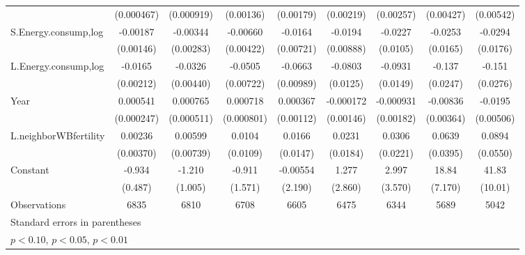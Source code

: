 \begin{table}[htbp]
\begin{tabular}{l*{8}{c}}
                    &  (0.000467)         &  (0.000919)         &   (0.00136)         &   (0.00179)         &   (0.00219)         &   (0.00257)         &   (0.00427)         &   (0.00542)         \\
[1em]
S.Energy.consump,log&    -0.00187         &    -0.00344         &    -0.00660         &     -0.0164\sym{**} &     -0.0194\sym{**} &     -0.0227\sym{**} &     -0.0253         &     -0.0294\sym{*}  \\
                    &   (0.00146)         &   (0.00283)         &   (0.00422)         &   (0.00721)         &   (0.00888)         &    (0.0105)         &    (0.0165)         &    (0.0176)         \\
[1em]
L.Energy.consump,log&     -0.0165\sym{***}&     -0.0326\sym{***}&     -0.0505\sym{***}&     -0.0663\sym{***}&     -0.0803\sym{***}&     -0.0931\sym{***}&      -0.137\sym{***}&      -0.151\sym{***}\\
                    &   (0.00212)         &   (0.00440)         &   (0.00722)         &   (0.00989)         &    (0.0125)         &    (0.0149)         &    (0.0247)         &    (0.0276)         \\
[1em]
Year                &    0.000541\sym{**} &    0.000765         &    0.000718         &    0.000367         &   -0.000172         &   -0.000931         &    -0.00836\sym{**} &     -0.0195\sym{***}\\
                    &  (0.000247)         &  (0.000511)         &  (0.000801)         &   (0.00112)         &   (0.00146)         &   (0.00182)         &   (0.00364)         &   (0.00506)         \\
[1em]
L.neighborWBfertility&     0.00236         &     0.00599         &      0.0104         &      0.0166         &      0.0231         &      0.0306         &      0.0639         &      0.0894         \\
                    &   (0.00370)         &   (0.00739)         &    (0.0109)         &    (0.0147)         &    (0.0184)         &    (0.0221)         &    (0.0395)         &    (0.0550)         \\
[1em]
Constant            &      -0.934\sym{*}  &      -1.210         &      -0.911         &    -0.00554         &       1.277         &       2.997         &       18.84\sym{***}&       41.83\sym{***}\\
                    &     (0.487)         &     (1.005)         &     (1.571)         &     (2.190)         &     (2.860)         &     (3.570)         &     (7.170)         &     (10.01)         \\
\hline
Observations        &        6835         &        6810         &        6708         &        6605         &        6475         &        6344         &        5689         &        5042         \\
\hline\hline
\multicolumn{9}{l}{\footnotesize Standard errors in parentheses}\\
\multicolumn{9}{l}{\footnotesize \sym{*} \(p<0.10\), \sym{**} \(p<0.05\), \sym{***} \(p<0.01\)}\\
\end{tabular}
\end{table}
